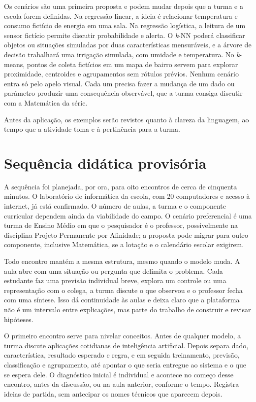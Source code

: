 Os cenários são uma primeira proposta e podem mudar depois que a turma e a escola forem definidas. Na regressão linear, a ideia é relacionar temperatura e consumo fictício de energia em uma sala. Na regressão logística, a leitura de um sensor fictício permite discutir probabilidade e alerta. O \textit{k}-NN poderá classificar objetos ou situações simuladas por duas características mensuráveis, e a árvore de decisão trabalhará uma irrigação simulada, com umidade e temperatura. No \textit{k}-means, pontos de coleta fictícios em um mapa de bairro servem para explorar proximidade, centroides e agrupamentos sem rótulos prévios. Nenhum cenário entra só pelo apelo visual. Cada um precisa fazer a mudança de um dado ou parâmetro produzir uma consequência observável, que a turma consiga discutir com a Matemática da série.

Antes da aplicação, os exemplos serão revistos quanto à clareza da linguagem, ao tempo que a atividade toma e à pertinência para a turma.

\section{Sequência didática provisória}

A sequência foi planejada, por ora, para oito encontros de cerca de cinquenta minutos. O laboratório de informática da escola, com 20 computadores e acesso à internet, já está confirmado. O número de aulas, a turma e o componente curricular dependem ainda da viabilidade do campo. O cenário preferencial é uma turma de Ensino Médio em que o pesquisador é o professor, possivelmente na disciplina Projeto Permanente por Afinidade; a proposta pode migrar para outro componente, inclusive Matemática, se a lotação e o calendário escolar exigirem.

Todo encontro mantém a mesma estrutura, mesmo quando o modelo muda. A aula abre com uma situação ou pergunta que delimita o problema. Cada estudante faz uma previsão individual breve, explora um controle ou uma representação com o colega, a turma discute o que observou e o professor fecha com uma síntese. Isso dá continuidade às aulas e deixa claro que a plataforma não é um intervalo entre explicações, mas parte do trabalho de construir e revisar hipóteses.

O primeiro encontro serve para nivelar conceitos. Antes de qualquer modelo, a turma discute aplicações cotidianas de inteligência artificial. Depois separa dado, característica, resultado esperado e regra, e em seguida treinamento, previsão, classificação e agrupamento, até apontar o que seria entregue ao sistema e o que se espera dele. O diagnóstico inicial é individual e acontece no começo desse encontro, antes da discussão, ou na aula anterior, conforme o tempo. Registra ideias de partida, sem antecipar os nomes técnicos que aparecem depois.

